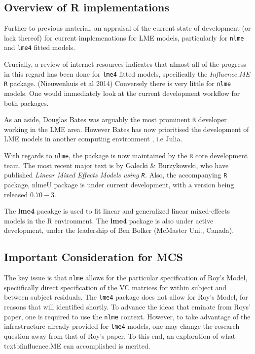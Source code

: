 \documentclass[12pt, a4paper]{report}
\theoremstyle{plain}
\theoremstyle{definition}
\theoremstyle{remark}
\begin{document}
\subsection{Overview of R implementations}
Further to previous material, an appraisal of the current state of development (or lack thereof) for current implemenations for LME models, particularly for \texttt{nlme} and \texttt{lme4} fitted models.

Crucially, a review of internet resources indicates that almost all of the progress in this regard has been done for \texttt{lme4} fitted models, specifically the \textit{Influence.ME} \texttt{R} package. (Nieuwenhuis et al 2014)
Conversely there is very little for \texttt{nlme} models. One would immediately look at the current development workflow for both packages.


As an aside, Douglas Bates was arguably the most prominent \texttt{R} developer working in the LME area. 
However Bates has now prioritised the development of LME models in another computing environment , i.e Julia. 


With regards to \texttt{nlme}, the package is now maintained by the \texttt{R} core development team. The most recent major text is by Galecki \& Burzykowski, who have published \textit{ Linear Mixed Effects Models using \texttt{R}. }
Also, the accompanying \texttt{R} package, nlmeU package is under current development, with a version being released $0.70-3$.



The \textbf{lme4} pacakge is used to fit linear and generalized linear mixed-effects models in the R environment.
The \textbf{lme4} package is also under active development, under the leadership of Ben Bolker (McMaster Uni., Canada).


\subsection*{Important Consideration for MCS}

The key issue is that \texttt{nlme} allows for the particular specification of Roy's Model, speciifically direct specification of the VC matrices for within subject and between subject residuals.
The \texttt{lme4} package does not allow for Roy's Model, for reasons that will identified shortly.
To advance the ideas that eminate from Roys' paper, one is required to use the \texttt{nlme} context. However, to take advantage of the infrastructure already provided for \texttt{lme4} models, one may change the research question away from that of Roy's paper. 
To this end, an exploration of what textbf{influence.ME} can accomplished is merited.
\end{document}
